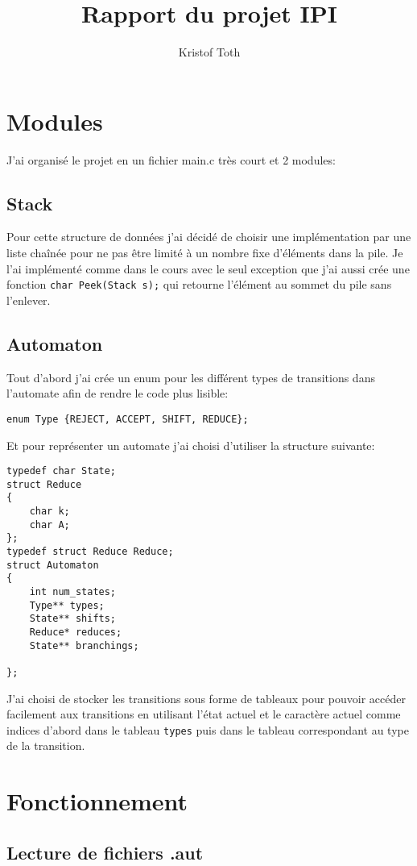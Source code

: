 \documentclass{article}
\title{Rapport du projet IPI}
\author{Kristof Toth}
\begin{document}
\maketitle

\section{Modules}
J'ai organisé le projet en un fichier main.c très court et 2 modules:
\subsection{Stack}

Pour cette structure de données j'ai décidé de choisir une implémentation par une liste chaînée pour ne pas être limité à un nombre fixe d'éléments dans la pile. Je l'ai implémenté comme dans le cours avec le seul exception que j'ai aussi crée une fonction \lstinline{char Peek(Stack s);} qui retourne l'élément au sommet du pile sans l'enlever.
\subsection{Automaton}

Tout d'abord j'ai crée un enum pour les différent types de transitions dans l'automate afin de rendre le code plus lisible:
\begin{lstlisting}
enum Type {REJECT, ACCEPT, SHIFT, REDUCE};
\end{lstlisting}
Et pour représenter un automate j'ai choisi d'utiliser la structure suivante:
\begin{lstlisting}
typedef char State;
struct Reduce
{
	char k;
	char A;
};
typedef struct Reduce Reduce;
struct Automaton
{
	int num_states;
	Type** types;
	State** shifts;
	Reduce* reduces;
	State** branchings;

};
\end{lstlisting}

J'ai choisi de stocker les transitions sous forme de tableaux pour pouvoir accéder facilement aux transitions en utilisant l'état actuel et le caractère actuel comme indices d'abord dans le tableau \lstinline{types} puis dans le tableau correspondant au type de la transition.

\section{Fonctionnement}

\subsection{Lecture de fichiers .aut}
\end{document}
